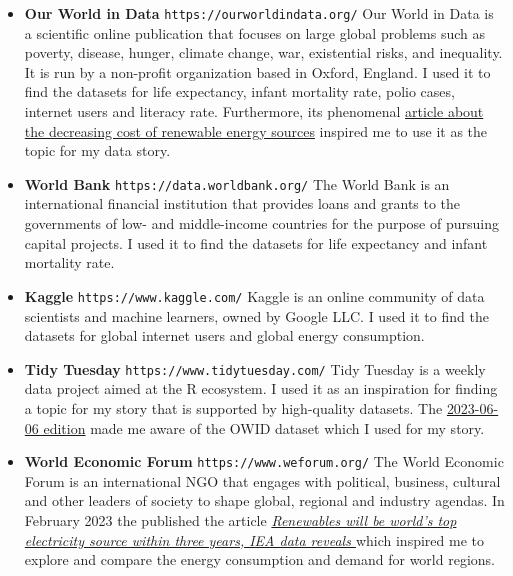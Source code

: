 \documentclass{article}
\begin{document}
\begin{itemize}
    \item \textbf{Our World in Data} \newline
    \texttt{https://ourworldindata.org/} \newline
    Our World in Data is a scientific online publication that focuses on large global problems such as poverty, disease, hunger, climate change, war, existential risks, and inequality.
    It is run by a non-profit organization based in Oxford, England.
    I used it to find the datasets for life expectancy, infant mortality rate, polio cases, internet users and literacy rate.\newline
    Furthermore, its phenomenal \href{https://ourworldindata.org/cheap-renewables-growth}{article about the decreasing cost of renewable energy sources} inspired me to use it as the topic for my data story.

    \item \textbf{World Bank} \newline
    \texttt{https://data.worldbank.org/} \newline
    The World Bank is an international financial institution that provides loans and grants to the governments of low- and middle-income countries for the purpose of pursuing capital projects.
    I used it to find the datasets for life expectancy and infant mortality rate.

    \item \textbf{Kaggle} \newline
    \texttt{https://www.kaggle.com/} \newline
    Kaggle is an online community of data scientists and machine learners, owned by Google LLC.
    I used it to find the datasets for global internet users and global energy consumption.

    \item \textbf{Tidy Tuesday} \newline
    \texttt{https://www.tidytuesday.com/} \newline
    Tidy Tuesday is a weekly data project aimed at the R ecosystem.
    I used it as an inspiration for finding a topic for my story that is supported by high-quality datasets.
    The \href{https://github.com/rfordatascience/tidytuesday/blob/master/data/2023/2023-06-06/readme.md}{2023-06-06 edition} made me aware of the OWID dataset which I used for my story.

    \item \textbf{World Economic Forum} \newline
    \texttt{https://www.weforum.org/} \newline
    The World Economic Forum is an international NGO that engages with political, business, cultural and other leaders of society to shape global, regional and industry agendas.
    In February 2023 the published the article \textit{\href{https://www.weforum.org/agenda/2023/02/renewables-world-top-electricity-source-data/}{Renewables will be world's top electricity source within three years, IEA data reveals
    }} which inspired me to explore and compare the energy consumption and demand for world regions.
    

\end{itemize}
\end{document}

